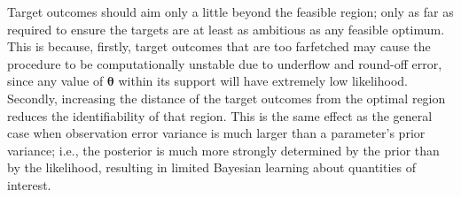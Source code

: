 \documentclass[12pt]{article}
\begin{document}
%
Target outcomes should aim only a little beyond the feasible region; only as far as required to ensure the targets are at least as ambitious as any feasible optimum.
%
This is because,
%
firstly, target outcomes that are too farfetched may cause the procedure to be computationally unstable due to underflow and round-off error, since any value of $\boldsymbol \theta$ within its support will have extremely low likelihood.
%
Secondly, increasing the distance of the target outcomes from the optimal region reduces the identifiability of that region.
%
%
This is the same effect as the general case when observation error variance is much larger than a parameter's prior variance; i.e., the posterior is much more strongly determined by the prior than by the likelihood, resulting in limited Bayesian learning about quantities of interest.
%
%
%


%
\end{document}
